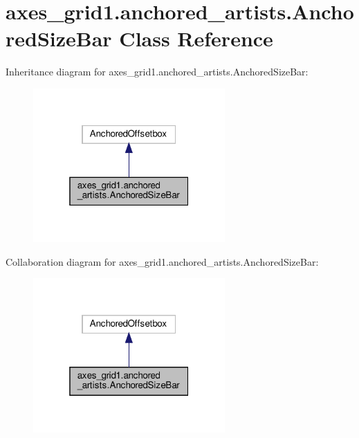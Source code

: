 \hypertarget{classaxes__grid1_1_1anchored__artists_1_1AnchoredSizeBar}{}\section{axes\+\_\+grid1.\+anchored\+\_\+artists.\+Anchored\+Size\+Bar Class Reference}
\label{classaxes__grid1_1_1anchored__artists_1_1AnchoredSizeBar}


Inheritance diagram for axes\+\_\+grid1.\+anchored\+\_\+artists.\+Anchored\+Size\+Bar\+:
\nopagebreak
\begin{figure}[H]
\begin{center}
\leavevmode
\includegraphics[width=208pt]{classaxes__grid1_1_1anchored__artists_1_1AnchoredSizeBar__inherit__graph}
\end{center}
\end{figure}


Collaboration diagram for axes\+\_\+grid1.\+anchored\+\_\+artists.\+Anchored\+Size\+Bar\+:
\nopagebreak
\begin{figure}[H]
\begin{center}
\leavevmode
\includegraphics[width=208pt]{classaxes__grid1_1_1anchored__artists_1_1AnchoredSizeBar__coll__graph}
\end{center}
\end{figure}
